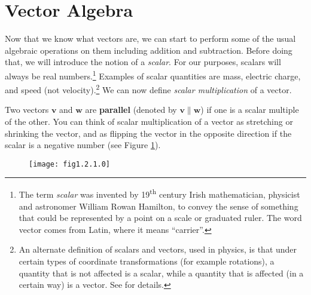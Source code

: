 \section{Vector Algebra}
Now that we know what vectors are, we can start to perform some of the usual algebraic operations on them including addition and subtraction. 
Before doing that, we will introduce the notion of a \emph{scalar}.
For our purposes, scalars will always be real numbers.\footnote{The term \emph{scalar} was invented by
19\textsuperscript{th} century
Irish mathematician, physicist and astronomer William Rowan Hamilton, to convey the sense of something
that could be represented by a point
on a scale or graduated ruler. 
The word vector comes from Latin, where it means ``carrier''.} 
Examples of scalar quantities are mass, electric charge, and speed (not velocity).\footnote{An alternate definition of scalars and vectors, used in physics, is that under certain types of coordinate transformations (for example rotations), a
quantity that is not affected is a scalar, while a quantity that is affected (in a certain way) is a vector.
See \cite{mar} for details.}
We can now define \emph{scalar multiplication} of a vector.


Two vectors $\mathbf{v}$ and $\mathbf{w}$ are \textbf{parallel} (denoted by $\mathbf{v} \parallel
\mathbf{w}$) if one is a scalar multiple of the other.
You can think of scalar multiplication of a vector as stretching or shrinking
the vector, and as flipping the vector in the opposite direction if the scalar is a negative number
(see Figure \ref{fig:scalar}).

\begin{figure}[h]
 \begin{center}
  \texttt{[image: fig1.2.1.0]}
 \end{center}
 \caption[]{}
 \label{fig:scalar}
\end{figure}

